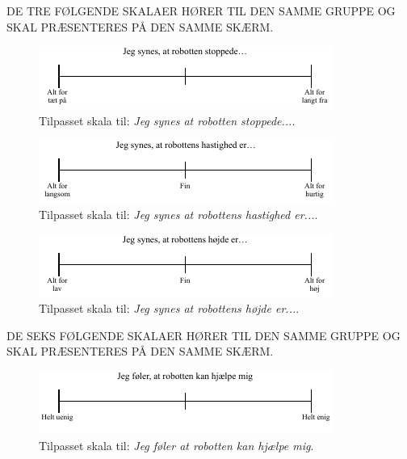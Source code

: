 \noindent
%
DE TRE FØLGENDE SKALAER HØRER TIL DEN SAMME GRUPPE OG SKAL PRÆSENTERES PÅ DEN SAMME SKÆRM.
%
\begin{figure}[H]
\centering
\includegraphics[width =\textwidth]{Figure/TilpasningAfSkalaer/TilpassetRStoppede} 
\caption{Tilpasset skala til: \textit{Jeg synes at robotten stoppede...}.}
\label{fig:TilpasningRStoppede}
\end{figure}
\noindent
%

%
\begin{figure}[H]
\centering
\includegraphics[width =\textwidth]{Figure/TilpasningAfSkalaer/TilpassetHastighedR} 
\caption{Tilpasset skala til: \textit{Jeg synes at robottens hastighed er...}.}
\label{fig:TilpasningHastighedR}
\end{figure}
\noindent
%
%
\begin{figure}[H]
\centering
\includegraphics[width =\textwidth]{Figure/TilpasningAfSkalaer/TilpassetHoejdeR} 
\caption{Tilpasset skala til: \textit{Jeg synes at robottens højde er...}.}
\label{fig:TilpasningHoejdeR}
\end{figure}
\noindent
%
DE SEKS FØLGENDE SKALAER HØRER TIL DEN SAMME GRUPPE OG SKAL PRÆSENTERES PÅ DEN SAMME SKÆRM.
%
\begin{figure}[H]
\centering
\includegraphics[width =\textwidth]{Figure/TilpasningAfSkalaer/TilpassetRobottenKanHjaelpe} 
\caption{Tilpasset skala til: \textit{Jeg føler at robotten kan hjælpe mig}.}
\label{fig:TilpasningRobottenKanHjaelpe}
\end{figure}
